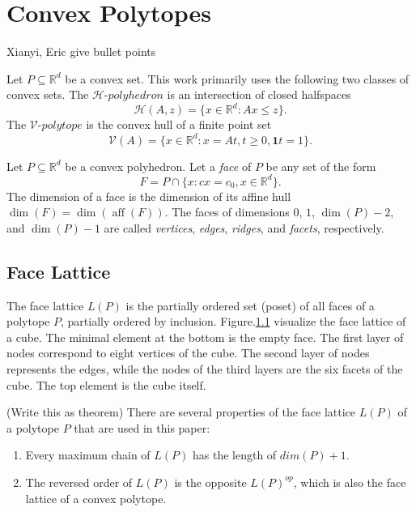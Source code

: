 \documentclass[conference]{IEEEtran}
\DeclareMathOperator{\aff}{aff}
\newcommand{\TODO}[1]{{\color{red} {{#1}}  }}
\begin{document}
\section{Convex Polytopes}

\TODO{Xianyi, Eric give bullet points}

Let $P \subseteq \mathbb{R}^d$ be a convex set. This work primarily uses the
following two classes of convex sets. The $\mathcal{H}\text{-}polyhedron$ is an
intersection of closed halfspaces
\begin{equation}
    \mathcal{H}(A,z) = \{x \in \mathbb{R}^d : Ax \leq z\}.
\end{equation}
The $\mathcal{V}\text{-}polytope$ is the convex hull of a finite point set
\begin{equation}
    \mathcal{V}(A) = \{x \in \mathbb{R}^d : x = At, t \geq 0, \mathbf{1}t = 1\}.
\end{equation}

Let $P \subseteq \mathbb{R}^d$ be a convex polyhedron. Let a \textit{face} of
$P$ be any set of the form 
\begin{equation}
    F = P \cap \{x : cx = c_0, x \in \mathbb{R}^d\}.
\end{equation}
The dimension of a face is the dimension of its affine hull $\dim(F) =
\dim(\aff(F))$. The faces of dimensions $0$, $1$, $\dim(P)-2$, and $\dim(P)-1$
are called \textit{vertices}, \textit{edges}, \textit{ridges}, and
\textit{facets}, respectively.

\subsection{Face Lattice}
The face lattice $L(P)$ is the partially ordered set (poset) of all faces of a polytope $P$, partially ordered by inclusion. Figure.\ref{} visualize the face lattice of a cube. The minimal element at the bottom is the empty face. The first layer of nodes correspond to eight vertices of the cube. The second layer of nodes represents the edges, while the nodes of the third layers are the six facets of the cube. The top element is the cube itself. 

(Write this as theorem) There are several properties of the face lattice $L(P)$ of a polytope $P$ that are used in this paper:
\begin{enumerate}
    \item Every maximum chain of $L(P)$ has the length of $dim(P) + 1$. 
    \item The reversed order of $L(P)$ is the opposite $L(P)^{op}$, which is also the face lattice of a convex polytope.
\end{enumerate}
\end{document}
